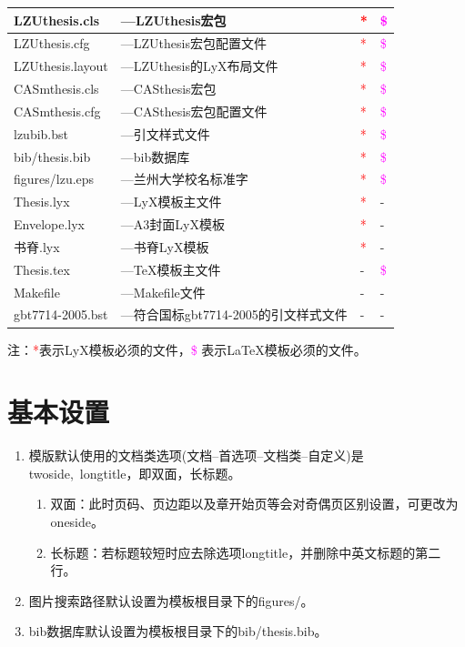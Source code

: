 \documentclass[twoside,longtitle]{LZUthesis}
\begin{document}
\begin{tabular}{|l|l|l|l|}
\hline
LZUthesis.cls & ---LZUthesis宏包 & \textcolor{red}{{*}} & \textcolor{magenta}{\$}\tabularnewline
\hline
LZUthesis.cfg & ---LZUthesis宏包配置文件 & \textcolor{red}{{*}} & \textcolor{magenta}{\$}\\
\hline
LZUthesis.layout & ---LZUthesis的LyX布局文件 & \textcolor{red}{{*}} & \textcolor{magenta}{\$}\\
\hline
CASmthesis.cls & ---CASthesis宏包 & \textcolor{red}{{*}} & \textcolor{magenta}{\$}\\
\hline
CASmthesis.cfg & ---CASthesis宏包配置文件 & \textcolor{red}{{*}} & \textcolor{magenta}{\$}\\
\hline
lzubib.bst & ---引文样式文件 & \textcolor{red}{{*}} & \textcolor{magenta}{\$}\\
\hline
bib/thesis.bib & ---bib数据库 & \textcolor{red}{{*}} & \textcolor{magenta}{\$}\\
\hline
figures/lzu.eps & ---兰州大学校名标准字 & \textcolor{red}{{*}} & \textcolor{magenta}{\$}\\
\hline
Thesis.lyx & ---LyX模板主文件 & \textcolor{red}{{*}} & -\\
\hline
Envelope.lyx & ---A3封面LyX模板 & \textcolor{red}{{*}} & -\\
\hline
书脊.lyx & ---书脊LyX模板 & \textcolor{red}{{*}} & -\\
\hline
Thesis.tex & ---\TeX{}模板主文件 & - & \textcolor{magenta}{\$}\\
\hline
Makefile & ---Makefile文件 & - & -\\
\hline
gbt7714-2005.bst & ---符合国标gbt7714-2005的引文样式文件 & - & -\\
\hline
\end{tabular}

注：\textcolor{red}{{*}}表示LyX模板必须的文件，\textcolor{magenta}{\$} 表示\LaTeX{}模板必须的文件。


\section{基本设置}
\begin{enumerate}
\item 模版默认使用的文档类选项(文档--首选项--文档类--自定义)是twoside,~longtitle，即双面，长标题。

\begin{enumerate}
\item 双面：此时页码、页边距以及章开始页等会对奇偶页区别设置，可更改为oneside。
\item 长标题：若标题较短时应去除选项longtitle，并删除中英文标题的第二行。
\end{enumerate}
\item 图片搜索路径默认设置为模板根目录下的figures/。
\item bib数据库默认设置为模板根目录下的bib/thesis.bib。
\end{enumerate}
\end{document}
